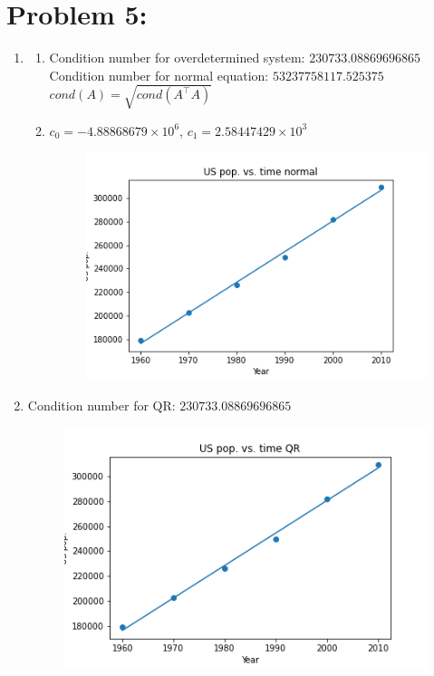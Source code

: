 \documentclass[10pt]{article}
\begin{document}
\section*{Problem 5:}
\begin{enumerate}[label=(\alph*)]
    \item \begin{enumerate}[label=(\roman*)]
        \item Condition number for overdetermined system: $230733.08869696865$\\
        Condition number for normal equation: $53237758117.525375$\\
        $cond(A)=\sqrt{cond(A^\top A)}$
        \item $c_0=-4.88868679\times 10^6$, $c_1=2.58447429\times 10^3$
        \begin{figure}[H]
            \includegraphics[scale=0.5]{US pop vs time normal.png}
        \end{figure}
        
    \end{enumerate}
    \item Condition number for QR: $230733.08869696865$
    \begin{figure}[H]
        \includegraphics[scale=0.5]{US pop vs time QR.png}

\end{figure}
\end{enumerate}
\end{document}
